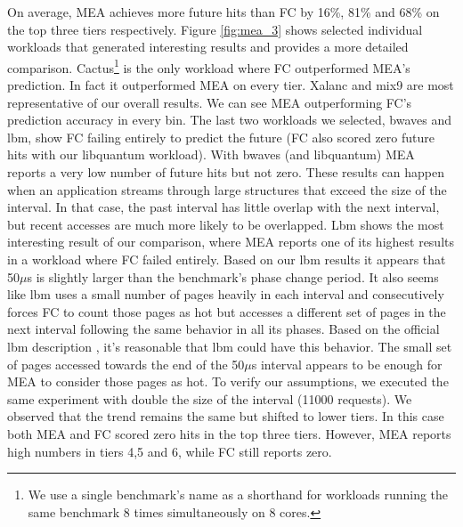 On average, MEA achieves more future hits than FC by 16\%, 81\% and 68\% on the top three tiers respectively. Figure \ref{fig:mea_3} shows selected individual workloads that generated interesting results and provides a more detailed comparison. Cactus\footnote{We use a single benchmark's name as a shorthand for workloads running the same benchmark 8 times simultaneously on 8 cores.} is the only workload where FC outperformed MEA's prediction. In fact it outperformed MEA on every tier. Xalanc and mix9 are most representative of our overall
results. We can see MEA outperforming FC's prediction accuracy in every bin. 
The last two workloads we selected, bwaves and lbm, show FC failing entirely to predict the future (FC also scored zero future hits with our libquantum workload). With bwaves (and libquantum) MEA reports a very low number of future hits but not zero. These results can happen when an application streams through large structures
that exceed the size of the interval.  In that case, the past interval has 
little overlap with the next interval, but recent accesses are much more
likely to be overlapped.
Lbm shows the most interesting result of our comparison, where MEA reports one of its highest results in a workload where FC failed entirely.
Based on our lbm results it appears that 50$\mu$s is slightly larger than the benchmark's phase change period. It also seems like lbm uses a small number of pages heavily in each interval and consecutively forces FC to count those pages as hot but accesses a different set of pages in the next interval following the same behavior in all its phases. Based on the official lbm description \cite{SPEC-LBM-DESCRIPTION}, it's reasonable that lbm could have this behavior. The small set of pages accessed towards the end of the 50$\mu$s interval appears to be enough for MEA to consider those pages as hot. To verify our assumptions, we executed the same experiment with double the size of the interval (11000 requests). We observed that the trend remains the same but shifted to lower tiers. In this case both MEA and FC scored zero hits in the top three tiers. However, MEA reports high numbers in tiers 4,5 and 6, while FC still reports zero.

